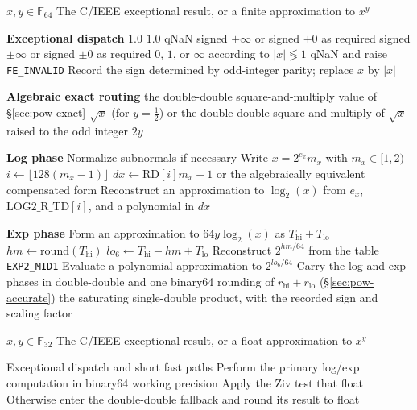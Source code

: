 \documentclass[11pt]{article}
\theoremstyle{plain}
\theoremstyle{remark}
\begin{document}
\begin{algorithm}
\caption{Binary64 $\mathrm{pow}(x,y)$}
\label{alg:pow64}
\begin{algorithmic}[1]
\Require $x,y \in \mathbb{F}_{64}$
\Ensure The C/IEEE exceptional result, or a finite approximation to $x^y$

\Statex \textbf{Exceptional dispatch}
 \Return $1.0$ \EndIf
{} \Return $1.0$ \EndIf
{} \Return qNaN \EndIf
{} \Return signed $\pm\infty$ or signed $\pm0$ as required \EndIf
{} \Return signed $\pm\infty$ or signed $\pm0$ as required \EndIf
{} \Return $0$, $1$, or $\infty$ according to $|x| \lessgtr 1$ \EndIf
{} \Return qNaN and raise \texttt{FE\_INVALID} \EndIf
\State Record the sign determined by odd-integer parity; replace $x$ by $|x|$

\Statex \textbf{Algebraic exact routing}
 \Return the double-double square-and-multiply value of \S\ref{sec:pow-exact} \EndIf
{} \Return $\sqrt{x}$ (for $y=\tfrac12$) or the double-double square-and-multiply of $\sqrt{x}$ raised to the odd integer $2y$ \EndIf

\Statex \textbf{Log phase}
\State Normalize subnormals if necessary
\State Write $x = 2^{e_x}m_x$ with $m_x \in [1,2)$
\State $i \gets \lfloor 128(m_x - 1) \rfloor$
\State $dx \gets \mathrm{RD}[i]m_x - 1$ or the algebraically equivalent compensated form
\State Reconstruct an approximation to $\log_2(x)$ from $e_x$, $\mathrm{LOG2\_R\_TD}[i]$, and a polynomial in $dx$

\Statex \textbf{Exp phase}
\State Form an approximation to $64y\log_2(x)$ as $T_{\mathrm{hi}} + T_{\mathrm{lo}}$
\State $hm \gets \mathrm{round}(T_{\mathrm{hi}})$
\State $lo_6 \gets T_{\mathrm{hi}} - hm + T_{\mathrm{lo}}$
\State Reconstruct $2^{hm/64}$ from the table \texttt{EXP2\_MID1}
\State Evaluate a polynomial approximation to $2^{lo_6/64}$
  \State Carry the log and exp phases in double-double and \Return one binary64 rounding of $r_{\mathrm{hi}} + r_{\mathrm{lo}}$ (\S\ref{sec:pow-accurate})
\Else{}
  \State \Return the saturating single-double product, with the recorded sign and scaling factor
\EndIf
\end{algorithmic}
\end{algorithm}

\begin{algorithm}
\caption{Binary32 $\mathrm{powf}(x,y)$}
\label{alg:powf}
\begin{algorithmic}[1]
\Require $x,y \in \mathbb{F}_{32}$
\Ensure The C/IEEE exceptional result, or a float approximation to $x^y$

\State Exceptional dispatch and short fast paths
\State Perform the primary log/exp computation in binary64 working precision
\State Apply the Ziv test
  \Return that float
\EndIf
\State Otherwise enter the double-double fallback and round its result to float
\end{algorithmic}
\end{algorithm}
\end{document}
